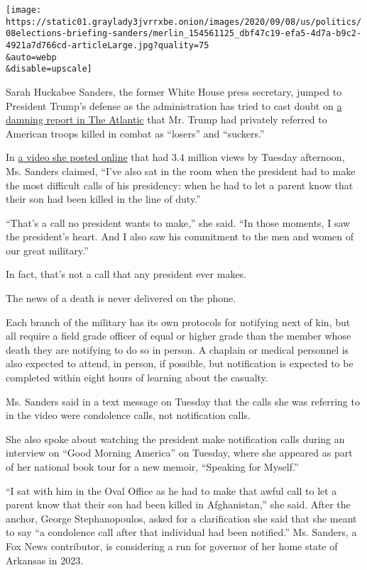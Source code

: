 \texttt{[image: https://static01.graylady3jvrrxbe.onion/images/2020/09/08/us/politics/08elections-briefing-sanders/merlin\_154561125\_dbf47c19-efa5-4d7a-b9c2-4921a7d766cd-articleLarge.jpg?quality=75\\\&auto=webp\\\&disable=upscale]}

Sarah Huckabee Sanders, the former White House press secretary, jumped
to President Trump's defense as the administration has tried to cast
doubt on
\href{https://www.theatlantic.com/politics/archive/2020/09/trump-americans-who-died-at-war-are-losers-and-suckers/615997/}{a
damning report in The Atlantic} that Mr. Trump had privately referred to
American troops killed in combat as ``losers'' and ``suckers.''

In \href{https://twitter.com/SarahHuckabee/status/1302756376448561153}{a
video she posted online} that had 3.4 million views by Tuesday
afternoon, Ms. Sanders claimed, ``I've also sat in the room when the
president had to make the most difficult calls of his presidency: when
he had to let a parent know that their son had been killed in the line
of duty.''

``That's a call no president wants to make,'' she said. ``In those
moments, I saw the president's heart. And I also saw his commitment to
the men and women of our great military.''

In fact, that's not a call that any president ever makes.

The news of a death is never delivered on the phone.

Each branch of the military has its own protocols for notifying next of
kin, but all require a field grade officer of equal or higher grade than
the member whose death they are notifying to do so in person. A chaplain
or medical personnel is also expected to attend, in person, if possible,
but notification is expected to be completed within eight hours of
learning about the casualty.

Ms. Sanders said in a text message on Tuesday that the calls she was
referring to in the video were condolence calls, not notification calls.

She also spoke about watching the president make notification calls
during an interview on ``Good Morning America'' on Tuesday, where she
appeared as part of her national book tour for a new memoir, ``Speaking
for Myself.''

``I sat with him in the Oval Office as he had to make that awful call to
let a parent know that their son had been killed in Afghanistan,'' she
said. After the anchor, George Stephanopoulos, asked for a clarification
she said that she meant to say ``a condolence call after that individual
had been notified.'' Ms. Sanders, a Fox News contributor, is considering
a run for governor of her home state of Arkansas in 2023.


